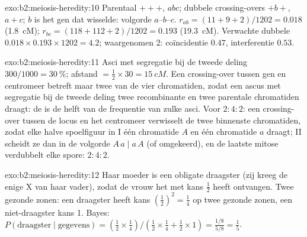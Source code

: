 \begin{solution}{exo:b2:meiosis-heredity:10}
Parentaal $+++$, $abc$; dubbele crossing-overs $+b+$, $a+c$; $b$ is het
gen dat wisselde: volgorde $a$--$b$--$c$. $r_{ab} = (11 + 9 + 2)/1202
= 0.018$ (\qty{1.8}{cM}); $r_{bc} = (118 + 112 + 2)/1202 = 0.193$
(\qty{19.3}{cM}). Verwachte dubbele $0.018\times 0.193\times 1202 =
4.2$; waargenomen 2: coïncidentie $0.47$, interferentie $0.53$.
\end{solution}

\begin{solution}{exo:b2:meiosis-heredity:11}
Asci met segregatie bij de tweede deling $300/1000 = \qty{30}{\%}$; afstand $=
\tfrac12\times 30 = \qty{15}{cM}$. Een crossing-over tussen gen en
centromeer betreft maar twee van de vier chromatiden, zodat een ascus
met segregatie bij de tweede deling twee recombinante en twee
parentale chromatiden draagt: de  is de helft van
de frequentie van zulke asci. Voor $2 : 4 : 2$: een crossing-over tussen
de locus en het centromeer verwisselt de twee binnenste chromatiden, zodat
elke halve spoelfiguur in  I één chromatide $A$ en één chromatide
$a$ draagt;  II scheidt ze dan in de volgorde $A\,a \mid
a\,A$ (of omgekeerd), en de laatste mitose verdubbelt elke spore:
$2 : 4 : 2$.
\end{solution}

\begin{solution}{exo:b2:meiosis-heredity:12}
Haar moeder is een obligate draagster (zij kreeg de enige X van haar
vader), zodat de vrouw het  met kans $\tfrac12$ heeft ontvangen.
Twee gezonde zonen: een draagster heeft kans $(\tfrac12)^2 = \tfrac14$
op twee gezonde zonen, een niet-draagster kans 1. Bayes:
$P(\text{draagster}\mid\text{gegevens}) = (\tfrac12\times\tfrac14)/(\tfrac12
\times\tfrac14 + \tfrac12\times 1) = \tfrac{1/8}{5/8} = \tfrac15$.
\end{solution}

